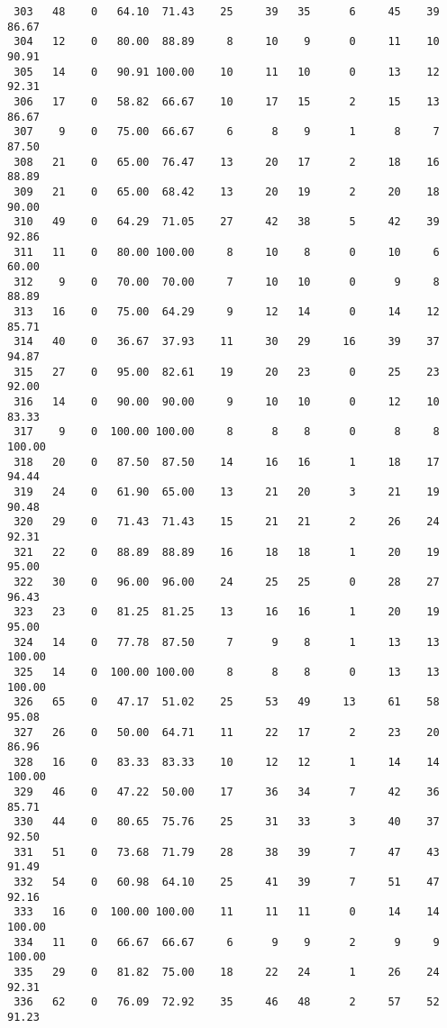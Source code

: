 \begin{verbatim}
 303   48    0   64.10  71.43    25     39   35      6     45    39    86.67
 304   12    0   80.00  88.89     8     10    9      0     11    10    90.91
 305   14    0   90.91 100.00    10     11   10      0     13    12    92.31
 306   17    0   58.82  66.67    10     17   15      2     15    13    86.67
 307    9    0   75.00  66.67     6      8    9      1      8     7    87.50
 308   21    0   65.00  76.47    13     20   17      2     18    16    88.89
 309   21    0   65.00  68.42    13     20   19      2     20    18    90.00
 310   49    0   64.29  71.05    27     42   38      5     42    39    92.86
 311   11    0   80.00 100.00     8     10    8      0     10     6    60.00
 312    9    0   70.00  70.00     7     10   10      0      9     8    88.89
 313   16    0   75.00  64.29     9     12   14      0     14    12    85.71
 314   40    0   36.67  37.93    11     30   29     16     39    37    94.87
 315   27    0   95.00  82.61    19     20   23      0     25    23    92.00
 316   14    0   90.00  90.00     9     10   10      0     12    10    83.33
 317    9    0  100.00 100.00     8      8    8      0      8     8   100.00
 318   20    0   87.50  87.50    14     16   16      1     18    17    94.44
 319   24    0   61.90  65.00    13     21   20      3     21    19    90.48
 320   29    0   71.43  71.43    15     21   21      2     26    24    92.31
 321   22    0   88.89  88.89    16     18   18      1     20    19    95.00
 322   30    0   96.00  96.00    24     25   25      0     28    27    96.43
 323   23    0   81.25  81.25    13     16   16      1     20    19    95.00
 324   14    0   77.78  87.50     7      9    8      1     13    13   100.00
 325   14    0  100.00 100.00     8      8    8      0     13    13   100.00
 326   65    0   47.17  51.02    25     53   49     13     61    58    95.08
 327   26    0   50.00  64.71    11     22   17      2     23    20    86.96
 328   16    0   83.33  83.33    10     12   12      1     14    14   100.00
 329   46    0   47.22  50.00    17     36   34      7     42    36    85.71
 330   44    0   80.65  75.76    25     31   33      3     40    37    92.50
 331   51    0   73.68  71.79    28     38   39      7     47    43    91.49
 332   54    0   60.98  64.10    25     41   39      7     51    47    92.16
 333   16    0  100.00 100.00    11     11   11      0     14    14   100.00
 334   11    0   66.67  66.67     6      9    9      2      9     9   100.00
 335   29    0   81.82  75.00    18     22   24      1     26    24    92.31
 336   62    0   76.09  72.92    35     46   48      2     57    52    91.23

\end{verbatim}
